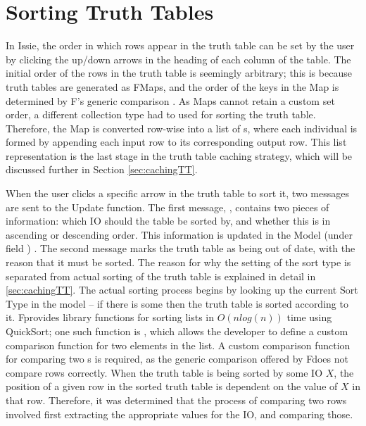 \section{Sorting Truth Tables}
In Issie, the order in which rows appear in the truth table can be set by the user by clicking the up/down arrows in the heading of each column of the table. The initial order of the rows in the truth table is seemingly arbitrary; this is because truth tables are generated as F\fsharp Maps, and the order of the keys in the Map is determined by F\fsharp's generic comparison \cite{fsmaps}. As Maps cannot retain a custom set order, a different collection type had to used for sorting the truth table. Therefore, the Map is converted row-wise into a list of s, where each individual  is formed by appending each input row to its corresponding output row. This list representation is the last stage in the truth table caching strategy, which will be discussed further in Section \ref{sec:cachingTT}.

When the user clicks a specific arrow in the truth table to sort it, two messages are sent to the Update function. The first message, , contains two pieces of information: which IO should the table be sorted by, and whether this is in ascending or descending order. This information is updated in the Model (under field ) . The second message marks the truth table as being out of date, with the reason that it must be sorted. The reason for why the setting of the sort type is separated from actual sorting of the truth table is explained in detail in \ref{sec:cachingTT}. The actual sorting process begins by looking up the current Sort Type in the model -- if there is some then the truth table is sorted according to it. 
F\fsharp provides library functions for sorting lists in $O(n log(n))$ time using QuickSort; one such function is , which allows the developer to define a custom comparison function for two elements in the list. A custom comparison function for comparing two s is required, as the generic comparison offered by F\fsharp does not compare rows correctly. When the truth table is being sorted by some IO $X$, the position of a given row in the sorted truth table is dependent on the value of $X$ in that row. Therefore, it was determined that the process of comparing two rows involved first extracting the appropriate  values for the IO, and comparing those.

